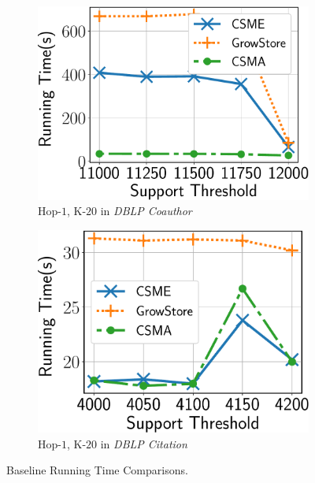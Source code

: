 \begin{figure}
\begin{subfigure}[b]{0.25\textwidth}
		\includegraphics[scale=0.24]{img2/coauthordblp/coauthordblp_h1.pdf}
		\caption{\scriptsize {\sf Hop-$1$, K-$20$} in {\em DBLP Coauthor}}
		\label{fig:coauthordblp_h1}
	\end{subfigure}%
	\begin{subfigure}[b]{0.25\textwidth}
		\includegraphics[scale=0.24]{img2/citationdblp/citationdblp_h1.pdf}
		\caption{\scriptsize {\sf Hop-$1$, K-$20$} in {\em DBLP Citation}}
		\label{fig:citationdblp_h1}
	\end{subfigure}%
	\vspace{-2mm}
	\caption{\scriptsize {\sf Baseline Running Time Comparisons}.}
	\label{fig:baseline_comp}
	\vspace{-2mm}
\end{figure}


